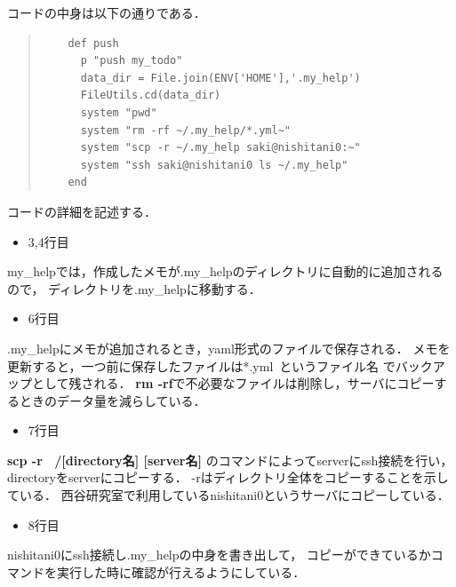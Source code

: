 コードの中身は以下の通りである．
\begin{quote}\begin{verbatim}
    def push
      p "push my_todo"
      data_dir = File.join(ENV['HOME'],'.my_help')
      FileUtils.cd(data_dir)
      system "pwd"
      system "rm -rf ~/.my_help/*.yml~"
      system "scp -r ~/.my_help saki@nishitani0:~"
      system "ssh saki@nishitani0 ls ~/.my_help" 
    end
\end{verbatim}\end{quote}

\newpage
コードの詳細を記述する．
\begin{itemize}
\item 3,4行目
\end{itemize}
\begin{description}
\item my\_helpでは，作成したメモが.my\_helpのディレクトリに自動的に追加されるので，
ディレクトリを.my\_helpに移動する．
\end{description}
\begin{itemize}
\item 6行目
\end{itemize}
\begin{description}
\item .my\_helpにメモが追加されるとき，yaml形式のファイルで保存される．
メモを更新すると，一つ前に保存したファイルは*.yml~というファイル名
でバックアップとして残される．
\textbf{rm -rf}で不必要なファイルは削除し，サーバにコピーするときのデータ量を減らしている．
\end{description}

\begin{itemize}
\item 7行目
\end{itemize}
\begin{description}
\item
\textbf{scp -r ~/[directory名] [server名]}
のコマンドによってserverにssh接続を行い，directoryをserverにコピーする．
-rはディレクトリ全体をコピーすることを示している．
西谷研究室で利用しているnishitani0というサーバにコピーしている．
\end{description}

\begin{itemize}
\item 8行目
\end{itemize}
\begin{description}
\item nishitani0にssh接続し.my\_helpの中身を書き出して，
コピーができているかコマンドを実行した時に確認が行えるようにしている．
\end{description}


